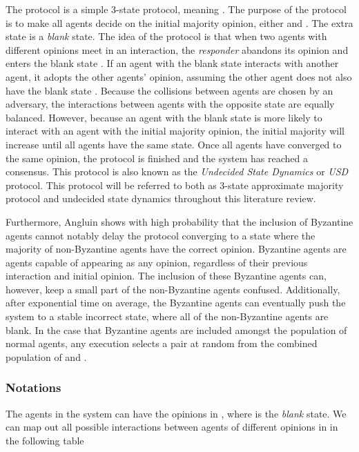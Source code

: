 The protocol is a simple 3-state protocol, meaning . The purpose of the protocol is to make all agents decide on the initial majority opinion, either  and . The extra state  is a \emph{blank} state. The idea of the protocol is that when two agents with different opinions meet in an interaction, the \emph{responder} abandons its opinion and enters the blank state . If an agent with the blank state  interacts with another agent, it adopts the other agents' opinion, assuming the other agent does not also have the blank state . Because the collisions between agents are chosen by an adversary, the interactions between agents with the opposite state are equally balanced. However, because an agent with the blank state is more likely to interact with an agent with the initial majority opinion, the initial majority will increase until all agents have the same state. Once all agents have converged to the same opinion, the protocol is finished and the system has reached a consensus. This protocol is also known as the \emph{Undecided State Dynamics} or \emph{USD} protocol. This protocol will be referred to both as 3-state approximate majority protocol and undecided state dynamics throughout this literature review. 

Furthermore, Angluin shows with high probability that the inclusion of  Byzantine agents cannot notably delay the protocol converging to a state where the majority of non-Byzantine agents have the correct opinion. Byzantine agents are agents capable of appearing as any opinion, regardless of their previous interaction and initial opinion. The inclusion of these Byzantine agents can, however, keep a small part of the non-Byzantine agents confused. Additionally, after exponential time on average, the Byzantine agents can eventually push the system to a stable incorrect state, where all of the non-Byzantine agents are blank. In the case that  Byzantine agents are included amongst the population  of normal agents, any execution selects a pair at random from the combined population of  and .

\subsubsection{Notations} \label{notations_angluin_usd}

The agents in the system can have the opinions in , where  is the \emph{blank} state. We can map out all possible interactions between agents of different opinions in  in the following table


